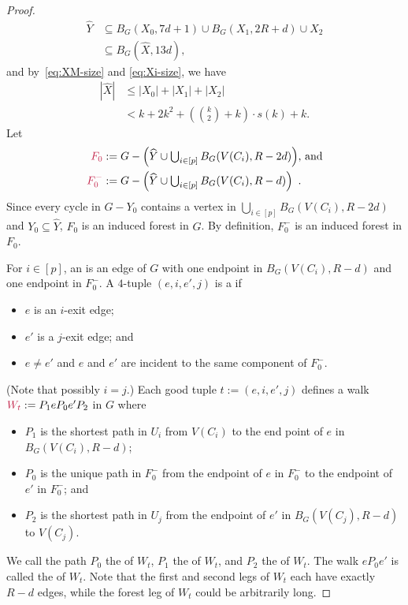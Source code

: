 \documentclass{patmorin}
\newcommand{\piotr}[1]{\textcolor{red}{Piotr: #1}}
\begin{document}
\begin{proof}
\begin{equation}
\begin{split}
\widehat{Y}&\textstyle\subseteq B_G(X_0,7d+1) \cup B_G(X_1,2R+d) \cup X_2\\
&\subseteq B_G(\widehat{X}, 13d), 
\end{split} 
\end{equation}
and by~\eqref{eq:XM-size} and \eqref{eq:Xi-size},  we have 
\begin{equation}
\begin{split}
|\widehat{X}|& \textstyle \leq |X_0| + |X_1| + |X_2|  \\
&\textstyle< k + 2k^2+(\binom{k}{2}+k)\cdot s(k) + k. %
\end{split} \label{x_prime_size}
\end{equation}
Let
\begin{align*}
\mathdefin{F_0}&:=\textstyle{G-\left(\widehat{Y}\cup \bigcup_{i\in[p]} B_G(V(C_i),R-2d)\right)}\text{, and}\\
\mathdefin{F^-_0}&:=\textstyle{G-\left(\widehat{Y}\cup \bigcup_{i\in[p]} B_G(V(C_i),R-d)\right)} \enspace . 
\end{align*}
Since every cycle in $G-Y_0$ contains a vertex in $\bigcup_{i\in[p]} B_G(V(C_i),R-2d)$ and $Y_0\subseteq \widehat{Y}$, $F_0$ is an induced forest in $G$. By definition, $F^-_0$  is an induced forest in $F_0$.

For $i\in[p]$, an  is an edge of $G$ with one endpoint in $B_G(V(C_i),R-d)$ and one endpoint in $F_0^-$.
A $4$-tuple $(e,i,e',j)$ is a  if
\begin{itemize}[noitemsep,nosep]
  \item $e$ is an $i$-exit edge;
  \item $e'$ is a $j$-exit edge;
  and \item $e\neq e'$ and $e$ and $e'$ are incident to the same component of $F_0^-$.
\end{itemize}
(Note that possibly $i=j$.) 
Each good tuple $t:=(e,i,e',j)$  defines a walk $\mathdefin{W_t}:=P_1eP_0e'P_2$ in $G$ where
\begin{itemize}[noitemsep,nosep]
  \item $P_1$ is the shortest path in $U_i$ from $V(C_i)$ to the end point of $e$ in $B_G(V(C_i),R-d)$;
  \item $P_0$ is the unique path in $F_0^-$ from the endpoint of $e$ in $F^-_0$ to the endpoint of $e'$ in $F^-_0$; and
  \item $P_2$ is the shortest path in $U_j$ from the endpoint of $e'$ in $B_G(V(C_j),R-d)$ to $V(C_j)$.
\end{itemize}
We call the path $P_0$ the  of $W_t$, $P_1$ the  of $W_t$, and $P_2$ the  of $W_t$.  The walk $eP_0e'$ is called the  of $W_t$.  Note that the first and second legs of $W_t$ each have exactly $R-d$ edges, while the forest leg of $W_t$ could be arbitrarily long.


\end{proof}
\end{document}
